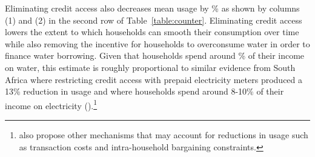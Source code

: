 \documentclass[12pt]{article}
\begin{document}
Eliminating credit access also decreases mean usage by \unskip\% as shown by columns (1) and (2) in the second row of Table~\ref{table:counter}.  Eliminating credit access lowers the extent to which households can smooth their consumption over time while also removing the incentive for households to overconsume water in order to finance water borrowing.  Given that households spend around \unskip\% of their income on water, this estimate is roughly proportional to similar evidence from South Africa where restricting credit access with prepaid electricity meters produced a 13\% reduction in usage and where households spend around 8-10\% of their income on electricity (\cite{jack2016charging}).\footnote{\cite{jack2016charging} also propose other mechanisms that may account for reductions in usage such as transaction costs and intra-household bargaining constraints.}
\end{document}
